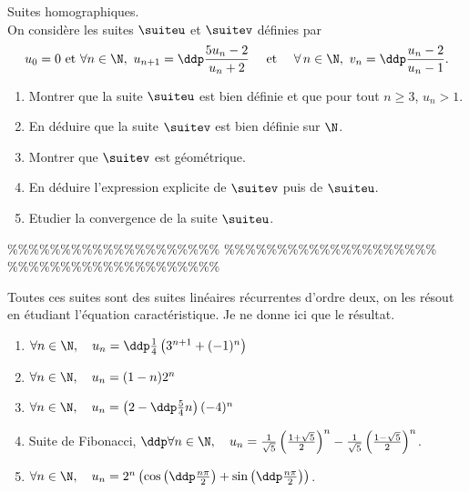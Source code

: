 



\begin{exercice}  \; Suites homographiques.\\
\noindent On consid\`ere les suites $\suiteu$ et $\suitev$ d\'efinies par
$$u_0=0\ \hbox{et}\ \forall n\in\N,\ u_{n+1}=\ddp\frac{5u_n-2}{u_n+2} \quad \textmd{ et } \quad \forall \, n \in \N, \ v_n = \ddp\frac{u_n-2}{u_n-1}.$$
\begin{enumerate}
 \item
Montrer que la suite $\suiteu$ est bien d\'efinie et que pour tout $n\geq 3$, $u_n>1$. 
\item 
En d\'eduire que la suite $\suitev$  est bien d\'efinie sur $\N$.
\item 
Montrer que $\suitev$ est g\'eom\'etrique.
\item 
En d\'eduire l'expression explicite de $\suitev$ puis de $\suiteu$.
\item Etudier la convergence de la suite $\suiteu$.
\end{enumerate}
\end{exercice}


\%\%\%\%\%\%\%\%\%\%\%\%\%\%\%\%\%\%\%\%
\%\%\%\%\%\%\%\%\%\%\%\%\%\%\%\%\%\%\%\%
\%\%\%\%\%\%\%\%\%\%\%\%\%\%\%\%\%\%\%\%




\begin{correction} \;
Toutes ces suites sont des suites lin\'eaires r\'ecurrentes d'ordre deux, on les r\'esout en \'etudiant l'\'equation caract\'eristique. Je ne donne ici que le r\'esultat.
\begin{enumerate}
 \item $\forall n\in\N,\quad u_n=\ddp\frac{1}{4}\left( 3^{n+1}+(-1)^n \right)$
\item $\forall n\in\N,\quad u_n=(1-n) 2^n  $
\item $\forall n\in\N,\quad u_n=\left(2-\ddp\frac{5}{4}n\right)(-4)^{n}  $
\item Suite de Fibonacci, $\ddp \forall n\in\N,\quad u_n=\frac{1}{\sqrt{5}}\left(\frac{1+\sqrt{5}}{2}\right)^n-\frac{1}{\sqrt{5}}\left(\frac{1-\sqrt{5}}{2}\right)^n$.
\item $\forall n\in\N,\quad u_n=2^n\left( \cos{\left( \ddp\frac{n\pi}{2} \right)}+\sin{\left( \ddp\frac{n\pi}{2} \right)}  \right) $.
\end{enumerate}
\end{correction}